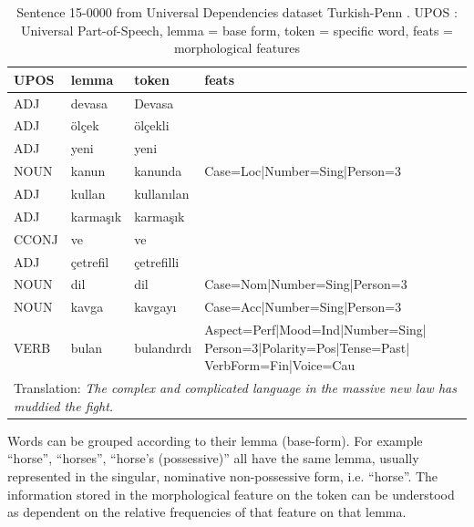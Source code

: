 \documentclass[USenglish]{article}
\begin{document}
\begin{table}[h]
    \centering
    \caption{Sentence 15-0000 from Universal Dependencies dataset Turkish-Penn \citep{kuzgun_2020_UD_turkish_penn}. UPOS : Universal Part-of-Speech, lemma = base form, token = specific word, feats = morphological features} %
    \label{tab:turkish_example}   
    \begin{tabular}{p{1.5cm}p{2cm}p{2cm}p{6cm}}
\toprule
	\textbf{UPOS}	&	\textbf{lemma}	&	\textbf{token}	&	\textbf{feats}	\\
    \midrule
	ADJ	&	devasa	&	Devasa	&	\\    \midrule
	ADJ	&	ölçek	&	ölçekli	&\\    \midrule
ADJ	&	yeni	&	yeni	&		\\    \midrule
	NOUN	&	kanun	&	kanunda	&	Case=Loc|Number=Sing|Person=3	\\    \midrule
	ADJ	&	kullan	&	kullanılan	&		\\    \midrule
ADJ	&	karmaşık	&	karmaşık	&\\    \midrule
CCONJ	&	ve	&	ve	&		\\    \midrule
ADJ	&	çetrefil	&	çetrefilli	&		\\    \midrule
	NOUN	&	dil	&	dil	&	Case=Nom|Number=Sing|Person=3	\\    \midrule
	NOUN	&	kavga	&	kavgayı	&	Case=Acc|Number=Sing|Person=3	\\    \midrule
	VERB	&	bulan	&	bulandırdı	&	Aspect=Perf|Mood=Ind|Number=Sing| Person=3|Polarity=Pos|Tense=Past| VerbForm=Fin|Voice=Cau	\\\midrule
   \multicolumn{4}{p{11cm}}{Translation: \textit{The complex and complicated language in the massive new law has muddied the fight.}}\\    \bottomrule


    \end{tabular}
\end{table}

Words can be grouped according to their lemma (base-form). 
For example ``horse'', ``horses'', ``horse's (possessive)'' all have the same lemma, usually represented in the singular, nominative non-possessive form, i.e. ``horse''.
The information stored in the morphological feature on the token can be understood as dependent on the relative frequencies of that feature on that lemma. 
\end{document}
